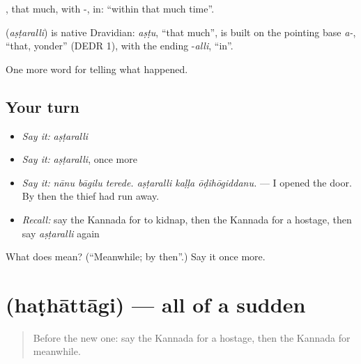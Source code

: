 , that much, with -, in: \textquotedblleft{}within that much time\textquotedblright{}.

\begin{cousinweb}
\textbf{} (\emph{aṣṭaralli}) is native Dravidian: \emph{aṣṭu}, \textquotedblleft{}that much\textquotedblright{}, is built on the pointing base \emph{a-}, \textquotedblleft{}that, yonder\textquotedblright{} (DEDR 1), with the ending -\emph{alli}, \textquotedblleft{}in\textquotedblright{}.
\end{cousinweb}

\begin{grammarlens}[title={What you've built}]
One more word for telling what happened.
\end{grammarlens}

\subsection*{Your turn}
\begin{itemize}
\raggedright
  \item \emph{Say it:} \emph{aṣṭaralli}
  \item \emph{Say it:} \emph{aṣṭaralli}, once more
  \item \emph{Say it:} \emph{nānu bāgilu terede. aṣṭaralli kaḷḷa ōḍihōgiddanu.} — I opened the door. By then the thief had run away.
  \item \emph{Recall:} say the Kannada for to kidnap, then the Kannada for a hostage, then say \emph{aṣṭaralli} again
\end{itemize}

\begin{tcolorbox}[breakable,colback=teal!4,colframe=teal!35!black,title={Before you move on}]
What does  mean? (\textquotedblleft{}Meanwhile; by then\textquotedblright{}.) Say it once more.
\end{tcolorbox}
\section[\texorpdfstring{\kn{ಹಠಾತ್ತಾಗಿ} (haṭhāttāgi)}{ಹಠಾತ್ತಾಗಿ (haṭhāttāgi)}]{ (haṭhāttāgi) — all of a sudden}

\label{lesson:KA-C327-hathattagi}



\begin{quote}
Before the new one: say the Kannada for a hostage, then the Kannada for meanwhile.
\end{quote}

